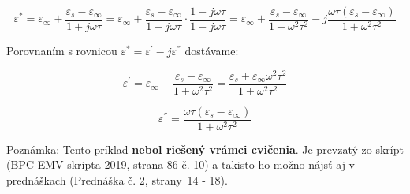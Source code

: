 \begin{equation*}
    {\varepsilon^{*}}={\varepsilon_\infty}+\frac{{\varepsilon_s}-{\varepsilon_\infty}}{1+j\omega\tau}={\varepsilon_\infty}+\frac{{\varepsilon_s}-{\varepsilon_\infty}}{1+j\omega\tau}\cdot\frac{1-j\omega\tau}{1-j\omega\tau}={\varepsilon_\infty}+\frac{{\varepsilon_s}-{\varepsilon_\infty}}{1+{\omega}^2{\tau}^2}-j \frac{\omega\tau({\varepsilon_s}-{\varepsilon_\infty})}{1+{\omega}^2{\tau}^2}
\end{equation*}

Porovnaním s rovnicou ${\varepsilon^{*}}={\varepsilon^{'}}-{j\varepsilon^{''}}$ dostávame:

\begin{equation*}
    {\varepsilon^{'}}={\varepsilon_\infty}+\frac{{\varepsilon_s}-{\varepsilon_\infty}}{1+{\omega}^2{\tau}^2}=\frac{{\varepsilon_s}+{\varepsilon_\infty}{\omega}^2{\tau}^2}{1+{\omega}^2{\tau}^2} \tag{Reálna časť}
\end{equation*}

\begin{equation*}
    {\varepsilon^{''}}=\frac{\omega\tau({\varepsilon_s}-{\varepsilon_\infty})}{1+{\omega}^2{\tau}^2} \tag{Imaginárna časť}
\end{equation*}

\color{red}Poznámka: Tento príklad \textbf{nebol riešený vrámci cvičenia}. Je prevzatý zo skrípt (BPC-EMV skripta 2019, strana 86 č. 10) a takisto ho možno nájsť aj v prednáškach (Prednáška č. 2, strany~14 - 18). \\

\color{black}



